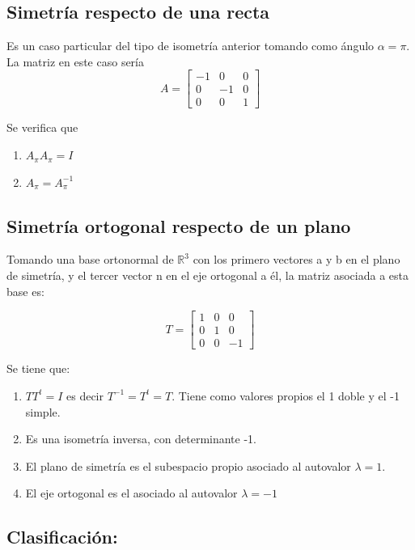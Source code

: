 \documentclass[10pt,a4paper]{article}
\theoremstyle{mystyle}
\begin{document}
\subsection{Simetría respecto de una recta}

Es un caso particular del tipo de isometría anterior tomando como ángulo $\alpha = \pi$. La matriz en este caso sería  
\[
A=
\begin{bmatrix}
-1 & 0 & 0 \\
0 &  -1  & 0 \\
0 & 0 & 1
\end{bmatrix}
\]


Se verifica que 

\begin{enumerate}
	\item
	$ A_\pi A_\pi = I $
	\item
	$ A_\pi = A_{\pi}^{-1} $
		
\end{enumerate}

\subsection{Simetría ortogonal respecto de un plano}

Tomando una base ortonormal de $\mathbb{R}^3$ con los primero vectores a y b en el plano de simetría, y el tercer vector n en el eje ortogonal a él, la matriz asociada a esta base es:

\[
T=
\begin{bmatrix}
1 & 0 & 0 \\
0 &  1  & 0 \\
0 & 0 & -1
\end{bmatrix}
\]

Se tiene que:

\begin{enumerate}
\item $TT^{t} = I$ es decir $T^{-1} = T^{t} = T$. Tiene como valores propios el 1 doble y el -1 simple.
\item Es una isometría inversa, con determinante -1.
\item El plano de simetría es el subespacio propio asociado al autovalor $\lambda = 1$.
\item El eje ortogonal es el asociado al autovalor $\lambda = -1$
\end{enumerate}

\subsection{Clasificación:}
\end{document}
